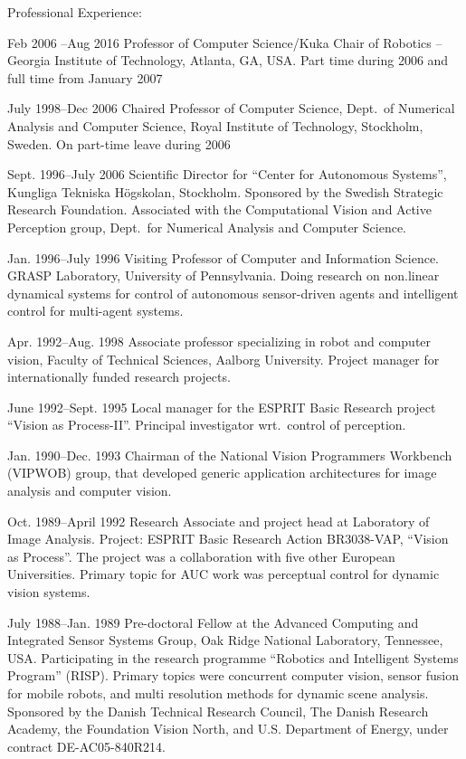 \documentclass{article}
\begin{document}
\begin{cv}
\begin{cvlist}{Professional Experience:}
\item[Feb 2006 --Aug 2016]  Professor of Computer Science/Kuka
  Chair of Robotics -- Georgia Institute of Technology, Atlanta, GA,
  USA. Part time during 2006 and full time from January 2007

\item[July 1998--Dec 2006] Chaired Professor of Computer Science,
  Dept.\ of Numerical Analysis and Computer Science, Royal Institute
  of Technology, Stockholm, Sweden. On part-time leave during 2006

\item[Sept. 1996--July 2006] Scientific Director for ``Center for
  Autonomous Systems'', Kungliga Tek\-ni\-ska H\"og\-skolan,
  Stock\-holm.  Sponsored by the Swedish Strategic Research
  Foundation. Associated with the Computational Vision and Active
  Perception group, Dept.~for Numerical Analysis and Computer
  Science.

\item[Jan. 1996--July 1996] Visiting Professor of Computer and
  Information Science.  GRASP Laboratory, University of Pennsylvania.
  Doing research on non.linear dynamical systems for control of
  autonomous sensor-driven agents and intelligent control for
  multi-agent systems.

\item[Apr. 1992--Aug. 1998] Associate professor specializing in robot
  and computer vision, Faculty of Technical Sciences, Aalborg
  University.  Project manager for internationally funded research
  projects.

\item[June 1992--Sept. 1995] Local manager for the ESPRIT Basic
  Research project ``Vision as Process-II''.  Principal investigator
  wrt.\ control of perception.

\item[Jan. 1990--Dec. 1993] Chairman of the National Vision
  Programmers Workbench (VIPWOB) group, that developed generic
  application architectures for image analysis and computer vision.

\item[Oct. 1989--April 1992] Research Associate and project head
  at Laboratory of Image Analysis.  Project: ESPRIT Basic Research
  Action BR3038-VAP, ``Vision as Process''.  The project was a
  collaboration with five other European Universities.  Primary topic
  for AUC work was perceptual control for dynamic vision systems.

\item[July 1988--Jan. 1989] Pre-doctoral Fellow at the Advanced
  Computing and Integrated Sensor Systems Group, Oak Ridge National
  Laboratory, Tennessee, USA. Participating in the research programme
  ``Robotics and Intelligent Systems Program'' (RISP). Primary topics
  were concurrent computer vision, sensor fusion for mobile robots,
  and multi resolution methods for dynamic scene analysis. Sponsored
  by the Danish Technical Research Council, The Danish Research
  Academy, the Foundation Vision North, and U.S. Department of Energy,
  under contract DE-AC05-840R214.


\end{cvlist}
\end{cv}
\end{document}
